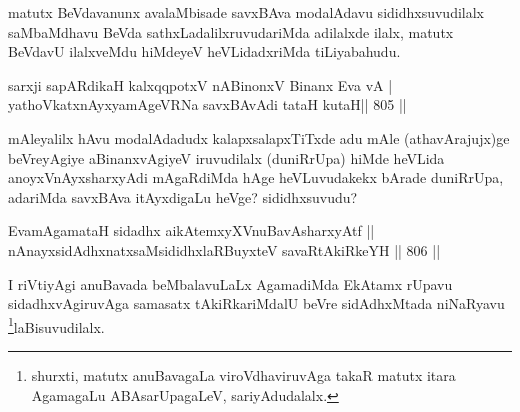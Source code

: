 \begin{artha}
matutx BeVdavanunx avalaMbisade savxBAva modalAdavu sididhxsuvudilalx saMbaMdhavu BeVda sathxLadalilxruvudariMda adilalxde ilalx, matutx BeVdavU ilalxveMdu hiMdeyeV heVLidadxriMda tiLiyabahudu.
\end{artha}


\begin{shl}
sarxji sapARdikaH kalxqqpotxV nABinonxV Binanx Eva vA | \\
yathoVkatxnAyxyamAgeVRNa \footnotemark[2]savxBAvAdi tataH kutaH\hfill ||  805 ||  
\end{shl}

\begin{artha}
mAleyalilx hAvu modalAdadudx kalapxsalapxTiTxde adu mAle (athavArajujx)ge beVreyAgiye aBinanxvAgiyeV iruvudilalx (duniRrUpa) hiMde heVLida anoyxVnAyxsharxyAdi mAgaRdiMda hAge heVLuvudakekx bArade duniRrUpa, adariMda savxBAva itAyxdigaLu heVge? sididhxsuvudu?
\end{artha}


\begin{shl}
EvamAgamataH sidadhx aikAtemxyXV\s nuBavAsharxyAtf ||  \\
nAnayxsidAdhxnatxsaMsididhxlaRBuyxteV savaRtAkiRkeYH \hfill||  806 ||  
\end{shl}

\begin{artha}
I riVtiyAgi anuBavada beMbalavuLaLx AgamadiMda EkAtamx rUpavu sidadhxvAgiruvAga samasatx tAkiRkariMdalU beVre sidAdhxMtada niNaRyavu \footnote{shurxti, matutx anuBavagaLa viroVdhaviruvAga takaR matutx itara AgamagaLu ABAsarUpagaLeV, sariyAdudalalx.
}laBisuvudilalx.
\end{artha}


